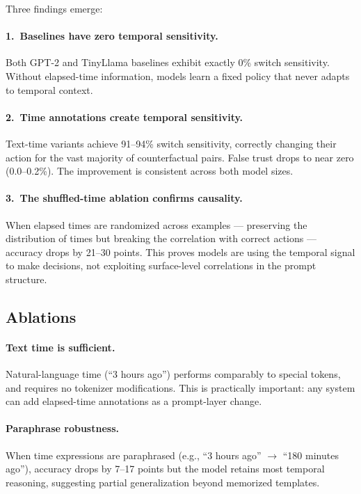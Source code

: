 \documentclass[11pt,a4paper]{article}
\begin{document}
Three findings emerge:

\paragraph{1.\ Baselines have zero temporal sensitivity.}
Both GPT-2 and TinyLlama baselines exhibit exactly 0\% switch sensitivity.
Without elapsed-time information, models learn a fixed policy that never adapts to temporal context.

\paragraph{2.\ Time annotations create temporal sensitivity.}
Text-time variants achieve 91--94\% switch sensitivity, correctly changing their action for the vast majority of counterfactual pairs.
False trust drops to near zero (0.0--0.2\%).
The improvement is consistent across both model sizes.

\paragraph{3.\ The shuffled-time ablation confirms causality.}
When elapsed times are randomized across examples --- preserving the distribution of times but breaking the correlation with correct actions --- accuracy drops by 21--30 points.
This proves models are using the temporal signal to make decisions, not exploiting surface-level correlations in the prompt structure.

\subsection{Ablations}

\paragraph{Text time is sufficient.}
Natural-language time (``3 hours ago'') performs comparably to special tokens, and requires no tokenizer modifications.
This is practically important: any system can add elapsed-time annotations as a prompt-layer change.

\paragraph{Paraphrase robustness.}
When time expressions are paraphrased (e.g., ``3 hours ago'' $\to$ ``180 minutes ago''), accuracy drops by 7--17 points but the model retains most temporal reasoning, suggesting partial generalization beyond memorized templates.
\end{document}
